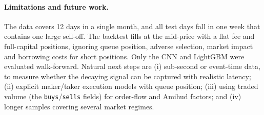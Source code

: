 \paragraph{Limitations and future work.} The data covers 12 days in a single month, and
all test days fall in one week that contains one large sell-off. The backtest fills at the
mid-price with a flat fee and full-capital positions, ignoring queue position, adverse
selection, market impact and borrowing costs for short positions. Only the CNN and
LightGBM were evaluated walk-forward. Natural next steps are (i) sub-second or
event-time data, to measure whether the decaying signal can be captured with realistic
latency; (ii) explicit maker/taker execution models with queue position; (iii) using
traded volume (the \texttt{buys}/\texttt{sells} fields) for order-flow and Amihud factors;
and (iv) longer samples covering several market regimes.
